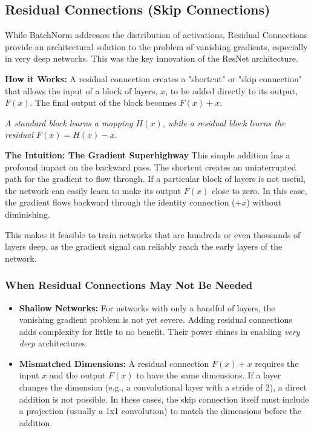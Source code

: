\documentclass{article}
\begin{document}
\newpage






















\subsection{Residual Connections (Skip Connections)}

While BatchNorm addresses the distribution of activations, Residual Connections provide an architectural solution to the problem of vanishing gradients, especially in very deep networks. This was the key innovation of the ResNet architecture.

\textbf{How it Works:}
A residual connection creates a "shortcut" or "skip connection" that allows the input of a block of layers, $x$, to be added directly to its output, $F(x)$. The final output of the block becomes $F(x) + x$.

\begin{center}
\textit{A standard block learns a mapping $H(x)$, while a residual block learns the residual $F(x) = H(x) - x$.}
\end{center}

\textbf{The Intuition: The Gradient Superhighway}
This simple addition has a profound impact on the backward pass. The shortcut creates an uninterrupted path for the gradient to flow through. If a particular block of layers is not useful, the network can easily learn to make its output $F(x)$ close to zero. In this case, the gradient flows backward through the identity connection ($+x$) without diminishing.

This makes it feasible to train networks that are hundreds or even thousands of layers deep, as the gradient signal can reliably reach the early layers of the network.


\subsubsection*{When Residual Connections May Not Be Needed}
\begin{itemize}
    \item \textbf{Shallow Networks:} For networks with only a handful of layers, the vanishing gradient problem is not yet severe. Adding residual connections adds complexity for little to no benefit. Their power shines in enabling \textit{very deep} architectures.
    \item \textbf{Mismatched Dimensions:} A residual connection $F(x)+x$ requires the input $x$ and the output $F(x)$ to have the same dimensions. If a layer changes the dimension (e.g., a convolutional layer with a stride of 2), a direct addition is not possible. In these cases, the skip connection itself must include a projection (usually a 1x1 convolution) to match the dimensions before the addition.
\end{itemize}
\end{document}
